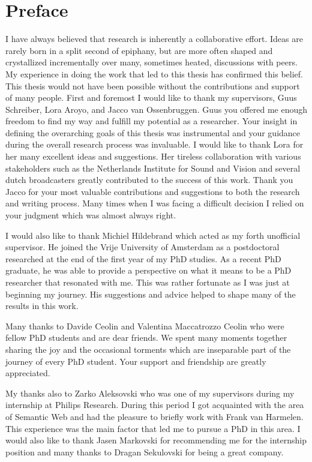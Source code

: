 \chapter{Preface}

I have always believed that research is inherently a collaborative effort. Ideas are rarely born in a split second of epiphany, but are more often shaped and crystallized incrementally over many, sometimes heated, discussions with peers. My experience in doing the work that led to this thesis has confirmed this belief. This thesis would not have been possible without the contributions and support of many people. First and foremost I would like to thank my supervisors, Guus Schreiber, Lora Aroyo, and Jacco van Ossenbruggen. Guus you offered me enough freedom to find my way and fulfill my potential as a researcher. Your insight in defining the overarching goals of this thesis was instrumental and your guidance during the overall research process was invaluable. I would like to thank Lora for her many excellent ideas and suggestions. Her tireless collaboration with various stakeholders such as the Netherlands Institute for Sound and Vision and several dutch broadcasters greatly contributed to the success of this work. Thank you Jacco for your most valuable contributions and suggestions to both the research and writing process. Many times when I was facing a difficult decision I relied on your judgment which was almost always right.

I would also like to thank Michiel Hildebrand which acted as my forth unofficial supervisor. He joined the Vrije University of Amsterdam as a postdoctoral researched at the end of the first year of my PhD studies. As a recent PhD graduate, he was able to provide a perspective on what it means to be a PhD researcher that resonated with me.  This was rather fortunate as I was  just at beginning my journey. His suggestions and advice helped to shape many of the results in this work.

Many thanks to Davide Ceolin and Valentina Maccatrozzo Ceolin who were fellow PhD students and are dear friends. We spent many moments together sharing the joy and the occasional torments which are inseparable part of the journey of every PhD student. Your support and friendship are greatly appreciated.

My thanks also to Zarko Aleksovski who was one of my supervisors during my internship at Philips  Research. During this period I got acquainted with the area of Semantic Web and had the pleasure to briefly work with Frank van Harmelen. This experience was the main factor that led me to pursue a PhD in this area. I would also like to thank Jasen Markovski for recommending me for the internship position and many thanks to Dragan Sekulovski for being a great company.

